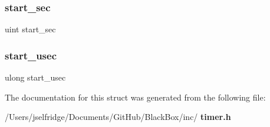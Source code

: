 \subsubsection{start\+\_\+sec}
{\footnotesize\ttfamily uint start\+\_\+sec}

\mbox{\label{structtimer__struct_a17e38e556ea00b604d86e63a11bab4d4}} 
\subsubsection{start\+\_\+usec}
{\footnotesize\ttfamily ulong start\+\_\+usec}



The documentation for this struct was generated from the following file\+:\begin{DoxyCompactItemize}
\item 
/\+Users/jselfridge/\+Documents/\+Git\+Hub/\+Black\+Box/inc/\textbf{ timer.\+h}\end{DoxyCompactItemize}
